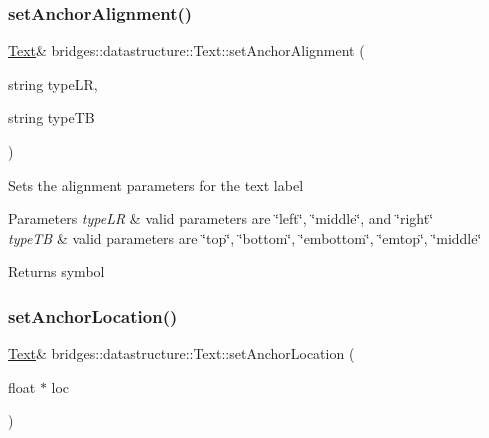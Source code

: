 \subsubsection{\texorpdfstring{set\+Anchor\+Alignment()}{setAnchorAlignment()}}
{\footnotesize\ttfamily \hyperlink{classbridges_1_1datastructure_1_1_text}{Text}\& bridges\+::datastructure\+::\+Text\+::set\+Anchor\+Alignment (\begin{DoxyParamCaption}\item[{string}]{type\+LR,  }\item[{string}]{type\+TB }\end{DoxyParamCaption})\hspace{0.3cm}{\ttfamily [inline]}}

Sets the alignment parameters for the text label


\begin{DoxyParams}{Parameters}
{\em type\+LR} & valid parameters are \char`\"{}left\char`\"{}, \char`\"{}middle\char`\"{}, and \char`\"{}right\char`\"{} \\
\hline
{\em type\+TB} & valid parameters are \char`\"{}top\char`\"{}, \char`\"{}bottom\char`\"{}, \char`\"{}embottom\char`\"{}, \char`\"{}emtop\char`\"{}, \char`\"{}middle\char`\"{}\\
\hline
\end{DoxyParams}
\begin{DoxyReturn}{Returns}
symbol 
\end{DoxyReturn}
\mbox{\label{classbridges_1_1datastructure_1_1_text_afc919b73ccbc5b331da644b9ce940806}} 
\subsubsection{\texorpdfstring{set\+Anchor\+Location()}{setAnchorLocation()}\hspace{0.1cm}{\footnotesize\ttfamily [1/2]}}
{\footnotesize\ttfamily \hyperlink{classbridges_1_1datastructure_1_1_text}{Text}\& bridges\+::datastructure\+::\+Text\+::set\+Anchor\+Location (\begin{DoxyParamCaption}\item[{float $\ast$}]{loc }\end{DoxyParamCaption})\hspace{0.3cm}{\ttfamily [inline]}}



